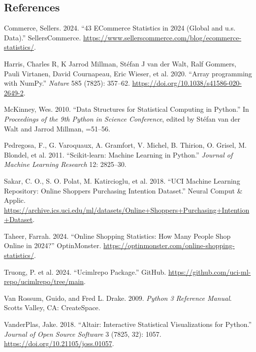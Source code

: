 \documentclass[
  letterpaper,
  DIV=11,
  numbers=noendperiod]{scrartcl}
\newlength{\cslhangindent}
\newenvironment{CSLReferences}[2] %
 {\begin{list}{}{%
  \setlength{\itemindent}{0pt}
  \setlength{\leftmargin}{0pt}
  \setlength{\parsep}{0pt}
  \ifodd #1
   \setlength{\leftmargin}{\cslhangindent}
   \setlength{\itemindent}{-1\cslhangindent}
  \fi
  \setlength{\itemsep}{#2\baselineskip}}}
 {\end{list}}
\begin{document}
\subsection*{References}\label{references}

\label{refs}
\begin{CSLReferences}{1}{0}
Commerce, Sellers. 2024. {``43 ECommerce Statistics in 2024 (Global and
u.s. Data).''} SellersCommerce.
\url{https://www.sellerscommerce.com/blog/ecommerce-statistics/}.

Harris, Charles R, K Jarrod Millman, Stéfan J van der Walt, Ralf
Gommers, Pauli Virtanen, David Cournapeau, Eric Wieser, et al. 2020.
{``{Array programming with NumPy}.''} \emph{Nature} 585 (7825): 357--62.
\url{https://doi.org/10.1038/s41586-020-2649-2}.

McKinney, Wes. 2010. {``Data Structures for Statistical Computing in
Python.''} In \emph{Proceedings of the 9th Python in Science
Conference}, edited by Stéfan van der Walt and Jarrod Millman, =51--56.

Pedregosa, F., G. Varoquaux, A. Gramfort, V. Michel, B. Thirion, O.
Grisel, M. Blondel, et al. 2011. {``{Scikit-learn: Machine Learning in
Python}.''} \emph{Journal of Machine Learning Research} 12: 2825--30.

Sakar, C. O., S. O. Polat, M. Katircioglu, et al. 2018. {``UCI Machine
Learning Repository: Online Shoppers Purchasing Intention Dataset.''}
Neural Comput \& Applic.
\url{https://archive.ics.uci.edu/ml/datasets/Online+Shoppers+Purchasing+Intention+Dataset}.

Taheer, Farrah. 2024. {``Online Shopping Statistics: How Many People
Shop Online in 2024?''} OptinMonster.
\url{https://optinmonster.com/online-shopping-statistics/}.

Truong, P. et al. 2024. {``Ucimlrepo Package.''} GitHub.
\url{https://github.com/uci-ml-repo/ucimlrepo/tree/main}.

Van Rossum, Guido, and Fred L. Drake. 2009. \emph{Python 3 Reference
Manual}. Scotts Valley, CA: CreateSpace.

VanderPlas, Jake. 2018. {``Altair: Interactive Statistical
Visualizations for Python.''} \emph{Journal of Open Source Software} 3
(7825, 32): 1057. \url{https://doi.org/10.21105/joss.01057}.

\end{CSLReferences}
\end{document}
